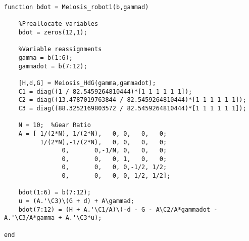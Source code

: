 \begin{lstlisting}[frame=lines,style=Matlab-editor,basicstyle = \mlttfamily, caption=MEIOSIS Robot State Calculator]
function bdot = Meiosis_robot1(b,gammad)

    %Preallocate variables
    bdot = zeros(12,1);

    %Variable reassignments
    gamma = b(1:6);
    gammadot = b(7:12);

    [H,d,G] = Meiosis_HdG(gamma,gammadot);
    C1 = diag((1 / 82.5459264810444)*[1 1 1 1 1 1]);
    C2 = diag((13.4787019763844 / 82.5459264810444)*[1 1 1 1 1 1]);
    C3 = diag((88.3252169803572 / 82.5459264810444)*[1 1 1 1 1 1]);

    N = 10;  %Gear Ratio
    A = [ 1/(2*N), 1/(2*N),   0, 0,   0,   0;
          1/(2*N),-1/(2*N),   0, 0,   0,   0;
                0,       0,-1/N, 0,   0,   0;
                0,       0,   0, 1,   0,   0;
                0,       0,   0, 0,-1/2, 1/2;
                0,       0,   0, 0, 1/2, 1/2];

    bdot(1:6) = b(7:12);
    u = (A.'\C3)\(G + d) + A\gammad;
    bdot(7:12) = (H + A.'\C1/A)\(-d - G - A\C2/A*gammadot - A.'\C3/A*gamma + A.'\C3*u);

end
\end{lstlisting}
